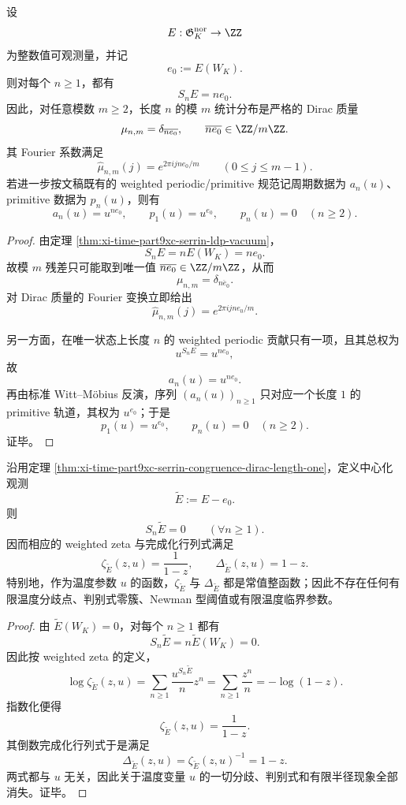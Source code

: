 \begin{theorem}[整数观测的确定同余律与长度一原子性]\label{thm:xi-time-part9xc-serrin-congruence-dirac-length-one}
设
\[
E:\mathfrak G_K^{\mathrm{nor}}\to\ZZ
\]
为整数值可观测量，并记
\[
e_0:=E(W_K).
\]
则对每个 \(n\ge 1\)，都有
\[
S_nE=n e_0.
\]
因此，对任意模数 \(m\ge 2\)，长度 \(n\) 的模 \(m\) 统计分布是严格的 Dirac 质量
\[
\mu_{n,m}=\delta_{\overline{n e_0}},
\qquad
\overline{n e_0}\in\ZZ/m\ZZ.
\]
其 Fourier 系数满足
\[
\widehat\mu_{n,m}(j)=e^{2\pi i j n e_0/m}
\qquad (0\le j\le m-1).
\]
若进一步按文稿既有的 weighted periodic/primitive 规范记周期数据为 \(a_n(u)\)、primitive 数据为 \(p_n(u)\)，则有
\[
a_n(u)=u^{n e_0},
\qquad
p_1(u)=u^{e_0},
\qquad
p_n(u)=0\quad (n\ge 2).
\]
\end{theorem}
\begin{proof}
由定理 \ref{thm:xi-time-part9xc-serrin-ldp-vacuum}，
\[
S_nE=nE(W_K)=n e_0.
\]
故模 \(m\) 残差只可能取到唯一值 \(\overline{n e_0}\in \ZZ/m\ZZ\)，从而
\[
\mu_{n,m}=\delta_{\overline{n e_0}}.
\]
对 Dirac 质量的 Fourier 变换立即给出
\[
\widehat\mu_{n,m}(j)=e^{2\pi i j n e_0/m}.
\]

另一方面，在唯一状态上长度 \(n\) 的 weighted periodic 贡献只有一项，且其总权为
\[
u^{S_nE}=u^{n e_0},
\]
故
\[
a_n(u)=u^{n e_0}.
\]
再由标准 Witt--M\"obius 反演，序列 \((a_n(u))_{n\ge 1}\) 只对应一个长度 \(1\) 的 primitive 轨道，其权为 \(u^{e_0}\)；于是
\[
p_1(u)=u^{e_0},
\qquad
p_n(u)=0\quad(n\ge 2).
\]
证毕。
\end{proof}

\begin{corollary}\label{cor:xi-time-part9xc-serrin-centered-zeta-temperature-flatness}
沿用定理 \ref{thm:xi-time-part9xc-serrin-congruence-dirac-length-one}，定义中心化观测
\[
\widetilde E:=E-e_0.
\]
则
\[
S_n\widetilde E=0
\qquad(\forall n\ge 1).
\]
因而相应的 weighted zeta 与完成化行列式满足
\[
\zeta_{\widetilde E}(z,u)=\frac{1}{1-z},
\qquad
\Delta_{\widetilde E}(z,u)=1-z.
\]
特别地，作为温度参数 \(u\) 的函数，\(\zeta_{\widetilde E}\) 与 \(\Delta_{\widetilde E}\) 都是常值整函数；因此不存在任何有限温度分歧点、判别式零簇、Newman 型阈值或有限温度临界参数。
\end{corollary}
\begin{proof}
由 \(\widetilde E(W_K)=0\)，对每个 \(n\ge 1\) 都有
\[
S_n\widetilde E=n\widetilde E(W_K)=0.
\]
因此按 weighted zeta 的定义，
\[
\log \zeta_{\widetilde E}(z,u)
=
\sum_{n\ge 1}\frac{u^{S_n\widetilde E}}{n}z^n
=
\sum_{n\ge 1}\frac{z^n}{n}
=
-\log(1-z).
\]
指数化便得
\[
\zeta_{\widetilde E}(z,u)=\frac{1}{1-z}.
\]
其倒数完成化行列式于是满足
\[
\Delta_{\widetilde E}(z,u)=\zeta_{\widetilde E}(z,u)^{-1}=1-z.
\]
两式都与 \(u\) 无关，因此关于温度变量 \(u\) 的一切分歧、判别式和有限半径现象全部消失。证毕。
\end{proof}

